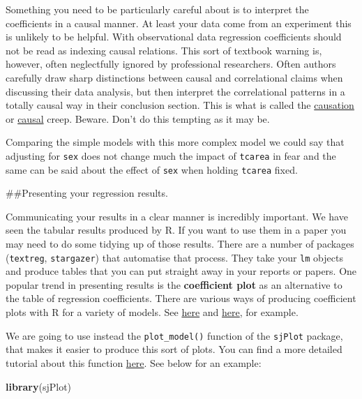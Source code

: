 \documentclass[]{book}
\newenvironment{Shaded}{\begin{snugshade}}{\end{snugshade}}
\newcommand{\KeywordTok}[1]{\textcolor[rgb]{0.13,0.29,0.53}{\textbf{#1}}}
\newcommand{\NormalTok}[1]{#1}
\theoremstyle{definition}
\theoremstyle{definition}
\theoremstyle{definition}
\theoremstyle{remark}
\begin{document}
Something you need to be particularly careful about is to interpret the
coefficients in a causal manner. At least your data come from an
experiment this is unlikely to be helpful. With observational data
regression coefficients should not be read as indexing causal relations.
This sort of textbook warning is, however, often neglectfully ignored by
professional researchers. Often authors carefully draw sharp
distinctions between causal and correlational claims when discussing
their data analysis, but then interpret the correlational patterns in a
totally causal way in their conclusion section. This is what is called
the
\href{http://junkcharts.typepad.com/numbersruleyourworld/2012/07/the-causation-creep.html}{causation}
or
\href{http://www.carlislerainey.com/2012/12/05/another-example-of-causal-creep/}{causal}
creep. Beware. Don't do this tempting as it may be.

Comparing the simple models with this more complex model we could say
that adjusting for \texttt{sex} does not change much the impact of
\texttt{tcarea} in fear and the same can be said about the effect of
\texttt{sex} when holding \texttt{tcarea} fixed.

\#\#Presenting your regression results.

Communicating your results in a clear manner is incredibly important. We
have seen the tabular results produced by R. If you want to use them in
a paper you may need to do some tidying up of those results. There are a
number of packages (\texttt{textreg}, \texttt{stargazer}) that
automatise that process. They take your \texttt{lm} objects and produce
tables that you can put straight away in your reports or papers. One
popular trend in presenting results is the \textbf{coefficient plot} as
an alternative to the table of regression coefficients. There are
various ways of producing coefficient plots with R for a variety of
models. See
\href{http://www.carlislerainey.com/2012/06/30/coefficient-plots-in-r/}{here}
and
\href{http://www.carlislerainey.com/2012/07/03/an-improvement-to-coefficient-plots/}{here},
for example.

We are going to use instead the \texttt{plot\_model()} function of the
\texttt{sjPlot} package, that makes it easier to produce this sort of
plots. You can find a more detailed tutorial about this function
\href{http://rpubs.com/sjPlot/sjplm}{here}. See below for an example:

\begin{Shaded}
\begin{Highlighting}[]
\KeywordTok{library}\NormalTok{(sjPlot)}
\end{Highlighting}
\end{Shaded}
\end{document}
